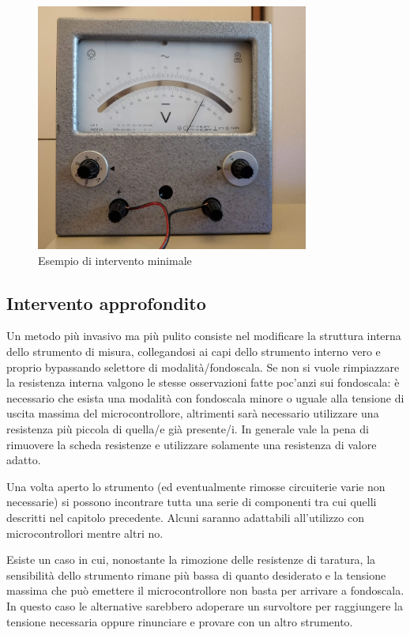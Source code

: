 \documentclass[12pt,a4paper]{report}
\begin{document}
\begin{figure}[h]
  \centering
  \includegraphics[width=0.8\textwidth]{interventominimale}
  \caption{Esempio di intervento minimale}
  \label{fig:interventominimale}
\end{figure}

\subsection{Intervento approfondito}
Un metodo più invasivo ma più pulito consiste nel modificare la struttura interna dello strumento di misura, collegandosi ai capi dello
strumento interno vero e proprio bypassando selettore di modalità/fondoscala.
Se non si vuole rimpiazzare la resistenza interna valgono le stesse osservazioni fatte poc'anzi sui fondoscala: è necessario che
esista una modalità con fondoscala minore o uguale alla tensione di uscita massima del microcontrollore, altrimenti sarà necessario
utilizzare una resistenza più piccola di quella/e già presente/i.
In generale vale la pena di rimuovere la scheda resistenze e utilizzare solamente una resistenza di valore adatto.

Una volta aperto lo strumento (ed eventualmente rimosse circuiterie varie non necessarie) si possono incontrare tutta una serie
di componenti tra cui quelli descritti nel capitolo precedente. Alcuni saranno adattabili all'utilizzo con microcontrollori mentre altri no.

Esiste un caso in cui, nonostante la rimozione delle resistenze di taratura, la sensibilità dello strumento rimane più bassa di quanto
desiderato e la tensione massima che può emettere il microcontrollore non basta per arrivare a fondoscala. In questo caso le alternative
sarebbero adoperare un survoltore per raggiungere la tensione necessaria oppure rinunciare e provare con un altro strumento.
\end{document}
